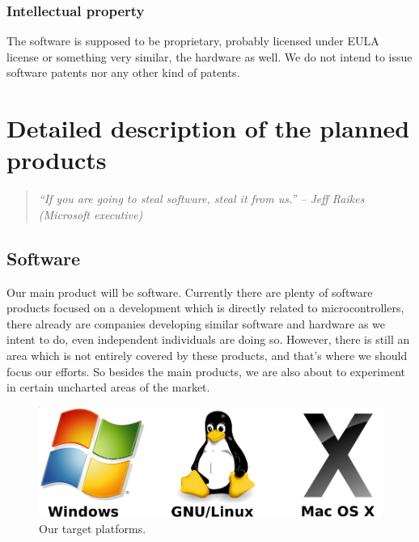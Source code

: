 \documentclass[a4paper,twoside,15pt]{book}
\begin{document}
		\subsection{Intellectual property}
			The software is supposed to be proprietary, probably licensed under EULA license or something very similar, the hardware as well. We do not intend to issue software patents nor any other kind of patents.

\chapter{Detailed description of the planned products}
	\begin{quote}
		\textit{``If you are going to steal software, steal it from us.'' -- Jeff Raikes (Microsoft executive)}
	\end{quote}

	\section{Software}
		Our main product will be software. Currently there are plenty of software products focused on a development which is directly related to microcontrollers, there already are companies developing similar software and hardware as we intent to do, even independent individuals are doing so. However, there is still an area which is not entirely covered by these products, and that's where we should focus our efforts. So besides the main products, we are also about to experiment in certain uncharted areas of the market.

		\begin{figure}[h!]
			\centering{}
			\includegraphics[width=.5\textwidth]{images/os.png}
			\caption{Our target platforms.}
		\end{figure}
\end{document}
